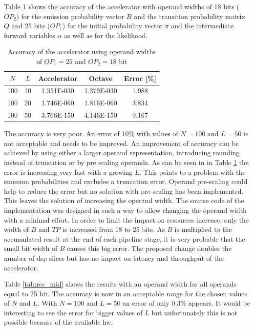 \documentclass[mscthesis]{usiinfthesis}
\begin{document}
Table \ref{tab:res_small} shows the accuracy of the accelerator with operand
widths of 18 bits ($OP_2$) for the emission probability vector $B$ and the
transition probability matrix $Q$ and 25 bits ($OP_1$) for the initial
probability vector $\pi$ and the intermediate forward variables $\alpha$ as
well as for the likelihood.

\begin{table}
    \footnotesize
    \begin{center}
    \begin{tabular}{|c|c|c|c|c|}
        \hline
        $N$ & $L$ & Accelerator & Octave & Error [\%] \\
        \hline
        \hline
        100 & 10 & 1.351E-030 & 1.379E-030 & 1.988 \\
        100 & 20 & 1.746E-060 & 1.816E-060 & 3.834 \\
        100 & 50 & 3.766E-150 & 4.146E-150 & 9.167 \\
        \hline
    \end{tabular}
    \end{center}
    \caption{Accuracy of the accelerator using operand widths of $OP_1 = 25$
        and $OP_2 = 18$ bit}
    \label{tab:res_small}
\end{table}

The accuracy is very poor. An error of 10\% with values of $N=100$ and $L=50$
is not acceptable and needs to be improved. An improvement of accuracy can be
achieved by using either a larger operand representation, introducing rounding
instead of truncation or by pre scaling operands. As can be seen in in Table
\ref{tab:res_small} the error is increasing very fast with a growing $L$. This
points to a problem with the emission probabilities and excludes a truncation
error. Operand pre-scaling could help to reduce the error but no solution with
pre-scaling has been implemented. This leaves the solution of increasing the
operand width. The source code of the implementation was designed in such a way
to allow changing the operand width with a minimal effort. In order to limit
the impact on resources increase, only the width of $B$ and $TP$ is increased
from 18 to 25 bits. As $B$ is multiplied to the accumulated result at the end
of each pipeline stage, it is very probable that the small bit width of $B$
causes this big error. The proposed change doubles the number of \gls{dsp}
slices but has no impact on latency and throughput of the accelerator.

Table \ref{tab:res_mid} shows the results with an operand width for all operands
equal to 25 bit. The accuracy is now in an acceptable range for the chosen
values of $N$ and $L$. With $N=100$ and $L=50$ an error of only 0.3\% appears.
It would be interesting to see the error for bigger values of $L$ but
unfortunately this is not possible because of the available \gls{hw}.
\end{document}
